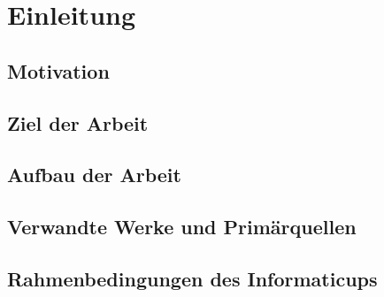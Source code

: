 \chapter{Einleitung}
\label{cha:Einleitung}
\setlength{\epigraphwidth}{4in}

\section{Motivation}

\section{Ziel der Arbeit}
\label{sec:ZielDerArbeit}

\section{Aufbau der Arbeit}

\section{Verwandte Werke und Primärquellen}
\label{sec:VerwandteWerke}

\section{Rahmenbedingungen des Informaticups}
